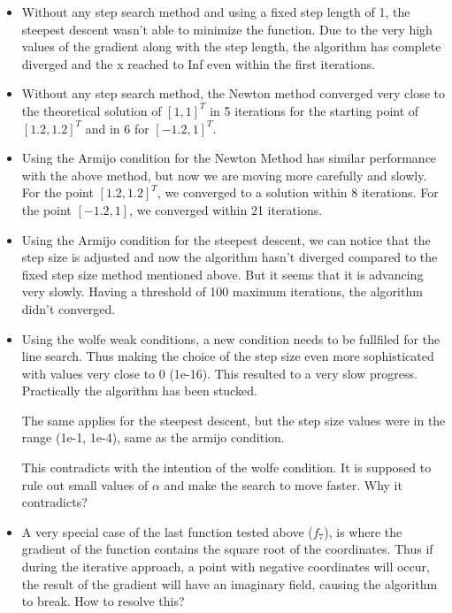\documentclass[a4paper,11pt]{article}
\numberwithin{equation}{section} %
\begin{document}
\begin{itemize}
    \item Without any step search method and using a fixed step length of 1, the steepest descent wasn't able to minimize the function. Due to the very high values of the gradient along with the step length, the algorithm has complete diverged and the x reached to Inf even within the first iterations.

    \item Without any step search method, the Newton method converged very close to the theoretical solution of $[1,1]^T$ in 5 iterations for the starting point of $[1.2,1.2]^T$ and in 6 for $[-1.2, 1]^T$.

    \item Using the Armijo condition for the Newton Method has similar performance with the above method, but now we are moving more carefully and slowly. For the point $[1.2,1.2]^T$, we converged to a solution within 8 iterations. For the point $[-1.2, 1]$, we converged within 21 iterations.

    \item Using the Armijo condition for the steepest descent, we can notice that the step size is adjusted and now the algorithm hasn't diverged compared to the fixed step size method mentioned above. But it seems that it is advancing very slowly. Having a threshold of 100 maximum iterations, the algorithm didn't converged.

    \item Using the wolfe weak conditions, a new condition needs to be fullfiled for the line search. Thus making the choice of the step size even more sophisticated with values very close to 0 (1e-16). This resulted to a very slow progress. Practically the algorithm has been stucked.

    The same applies for the steepest descent, but the step size values were in the range (1e-1, 1e-4), same as the armijo condition.

    This contradicts with the intention of the wolfe condition. It is supposed to rule out small values of $\alpha$ and make the search to move faster. Why it contradicts?

    \item A very special case of the last function tested above ($f_7$), is where the gradient of the function contains the square root of the coordinates. Thus if during the iterative approach, a point with negative coordinates will occur, the result of the gradient will have an imaginary field, causing the algorithm to break. How to resolve this?

\end{itemize}
\end{document}
